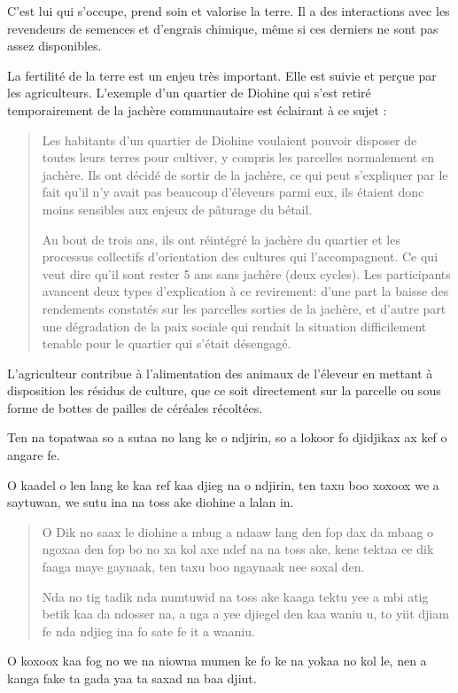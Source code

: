 \begin{paracol}{2}

  C'est lui qui s'occupe, prend soin et valorise la terre. Il a des interactions avec les revendeurs de semences et d'engrais chimique, même si ces derniers ne sont pas assez disponibles.

  La fertilité de la terre est un enjeu très important. Elle est suivie et perçue par les agriculteurs. L'exemple d'un quartier de Diohine qui s'est retiré temporairement de la jachère communautaire est éclairant à ce sujet :
  \begin{quote}
    Les habitants d'un quartier de Diohine voulaient pouvoir disposer de toutes leurs terres pour cultiver, y compris les parcelles normalement en jachère. Ils ont décidé de sortir de la jachère, ce qui peut s'expliquer par le fait qu'il n'y avait pas beaucoup d'éleveurs parmi eux, ils étaient donc moins sensibles aux enjeux de pâturage du bétail.

    Au bout de trois ans, ils ont réintégré la jachère du quartier et les processus collectifs d'orientation des cultures qui l'accompagnent. Ce qui veut dire qu'il sont rester 5 ans sans jachère (deux cycles). Les participants avancent deux types d'explication à ce revirement: d'une part la baisse des rendements constatés sur les parcelles sorties de la jachère, et d'autre part une dégradation de la paix sociale qui rendait la situation difficilement tenable pour le quartier qui s'était désengagé.
  \end{quote}

  L'agriculteur contribue à l'alimentation des animaux de l'éleveur en mettant à disposition les résidus de culture, que ce soit directement sur la parcelle ou sous forme de bottes de pailles de céréales récoltées.

\switchcolumn %

  Ten na topatwaa so a sutaa no lang ke o ndjirin, so a lokoor fo djidjikax ax kef o angare fe.

  O kaadel o len lang ke kaa ref kaa djieg na o ndjirin, ten taxu boo xoxoox we a saytuwan, we sutu ina na toss ake diohine a lalan in.

  \begin{quote}
    O Dik no saax le diohine a mbug a ndaaw lang den fop dax  da mbaag o ngoxaa den fop bo no xa kol axe ndef na na toss ake, kene tektaa ee dik faaga maye gaynaak, ten taxu boo ngaynaak nee soxal den.

    Nda no tig tadik nda numtuwid na toss ake kaaga tektu yee a mbi atig betik kaa da ndosser na, a nga a yee djiegel den kaa waniu u, to yiit djiam fe nda ndjieg ina fo sate fe it a waaniu.
  \end{quote}

O koxoox kaa fog no we na niowna mumen ke fo ke na yokaa no kol le, nen a kanga fake ta gada yaa ta saxad na baa djiut.

\end{paracol}

